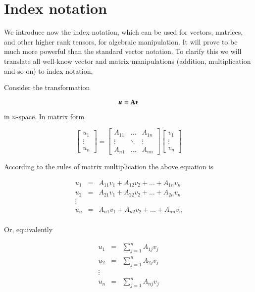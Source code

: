 \chapter{Index notation}

We introduce now the index notation, which can be used for vectors,
matrices, and other higher rank tensors, for algebraic
manipulation. It will prove to be much more powerful than the standard
vector notation. To clarify this we will translate all well-know
vector and matrix manipulations (addition, multiplication and so on)
to index notation.

Consider the transformation 

\begin{equation}
{\boldsymbol{u}} = \boldsymbol{\mathrm{A}} {\boldsymbol{v}} 
\end{equation}

in $n$-space. In matrix form 

\begin{equation}
\left[\begin{array}{c}
u_1\\
\vdots\\
u_n \end{array}\right] = \left[\begin{array}{ccc}
A_{11} & \dots  & A_{1n} \\
\vdots & \ddots &  \vdots\\
A_{n1} & \dots & A_{nn}
\end{array}\right] 
\left[\begin{array}{c}
v_1\\
\vdots\\
v_n \end{array}\right]
\end{equation}


According to the rules of matrix multiplication the above equation is 


\begin{eqnarray}
u_1 &=& A_{11} v_1 + A_{12} v_2 + \dots + A_{1n} v_n \\ 
u_2 &=& A_{21} v_1 + A_{22} v_2 + \dots + A_{2n} v_n \\ 
\vdots && \\
u_n &=& A_{n1} v_1 + A_{n2} v_2 + \dots + A_{nn} v_n \\ 
\end{eqnarray}

Or, equivalently 


\begin{eqnarray}
u_1 &=& \sum_{j=1}^n A_{1j} v_j \\ 
u_2 &=& \sum_{j=1}^n A_{2j} v_j \\ 
\vdots && \\
u_n &=& \sum_{j=1}^n A_{nj} v_j \\ 
\end{eqnarray}


